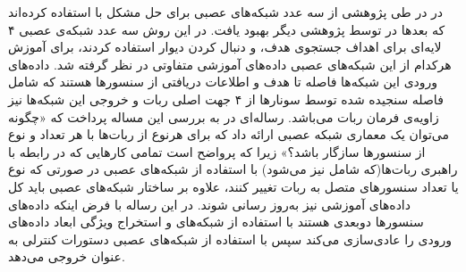 در  در طی پژوهشی از سه عدد شبکه‌های عصبی برای حل مشکل  با استفاده کرده‌اند که بعدها در  توسط پژوهشی دیگر بهبود یافت. در این روش سه عدد شبکه‌ی عصبی ۴ لایه‌ای برای اهداف جستجوی هدف،  و دنبال کردن دیوار استفاده کردند، برای آموزش هرکدام از این شبکه‌های عصبی داده‌های آموزشی متفاوتی در نظر گرفته شد. داده‌های ورودی این شبکه‌ها فاصله تا هدف و اطلاعات دریافتی از سنسورها هستند که شامل فاصله سنجیده شده توسط سونارها از ۴ جهت اصلی ربات و خروجی این شبکه‌ها نیز زاویه‌ی فرمان ربات می‌باشد.
رساله‌ای در  به بررسی این مساله پرداخت که «چگونه می‌توان یک معماری شبکه عصبی ارائه داد که برای هرنوع از ربات‌ها با هر تعداد و نوع از سنسورها سازگار باشد؟» زیرا که پرواضح است تمامی کارهایی که در رابطه با راهبری ربات‌ها(که شامل  نیز می‌شود) با استفاده از شبکه‌های عصبی در صورتی که نوع یا تعداد سنسورهای متصل به ربات تغییر کنند، علاوه بر ساختار شبکه‌های عصبی باید کل داده‌های آموزشی نیز به‌روز رسانی شوند. در این رساله با فرض اینکه داده‌های سنسورها دوبعدی هستند با استفاده از شبکه‌های  و استخراج ویژگی  ابعاد داده‌های ورودی را عادی‌سازی می‌کند سپس با استفاده از شبکه‌های عصبی دستورات کنترلی به عنوان خروجی می‌دهد.